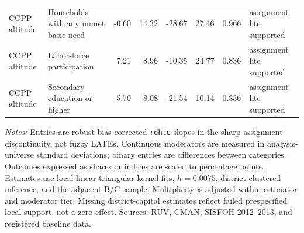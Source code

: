 \begin{table}[!htbp]
{\begin{tabular}{llrrrrrl}
CCPP altitude & Households with any unmet basic need & -0.60 & 14.32 & -28.67 & 27.46 & 0.966 & assignment hte supported \\
CCPP altitude & Labor-force participation & 7.21 & 8.96 & -10.35 & 24.77 & 0.836 & assignment hte supported \\
CCPP altitude & Secondary education or higher & -5.70 & 8.08 & -21.54 & 10.14 & 0.836 & assignment hte supported \\
\bottomrule
\end{tabular}}
\parbox{0.97\linewidth}{\footnotesize \textit{Notes:} Entries are robust bias-corrected \texttt{rdhte} slopes in the sharp assignment discontinuity, not fuzzy LATEs. Continuous moderators are measured in analysis-universe standard deviations; binary entries are differences between categories. Outcomes expressed as shares or indices are scaled to percentage points. Estimates use local-linear triangular-kernel fits, \(h=0.0075\), district-clustered inference, and the adjacent B/C sample. Multiplicity is adjusted within estimator and moderator tier. Missing district-capital estimates reflect failed prespecified local support, not a zero effect. Sources: RUV, CMAN, SISFOH 2012--2013, and registered baseline data.}
\end{table}
